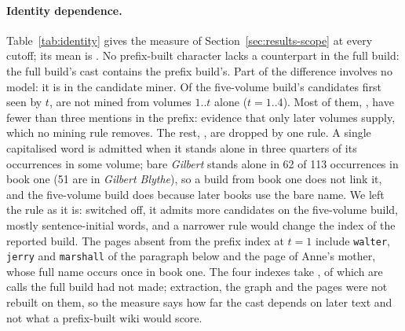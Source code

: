 \paragraph{Identity dependence.}
Table~\ref{tab:identity} gives the measure of Section~\ref{sec:results-scope} at every cutoff;
its mean is . No prefix-built character lacks a counterpart in the full build:
the full build's cast contains the prefix build's. Part of the difference involves no model:
it is in the candidate miner. Of the five-volume build's candidates first seen by $t$,
 are not mined from volumes $1..t$ alone ($t=1..4$). Most of them,
, have fewer than three mentions in the prefix: evidence that only later
volumes supply, which no mining rule removes. The rest, , are dropped by
one rule. A single capitalised word is admitted when it stands alone in
three quarters of its occurrences in some volume; bare \emph{Gilbert} stands alone in 62 of
113 occurrences in book one (51 are in \emph{Gilbert Blythe}), so a build from book one does
not link it, and the five-volume build does because later books use the bare name. We left
the rule as it is: switched off, it admits  more candidates on the
five-volume build, mostly sentence-initial words, and a narrower rule would change the index
of the reported build. The pages
absent from the prefix index at $t=1$ include \texttt{walter}, \texttt{jerry} and
\texttt{marshall} of the paragraph below and the page of Anne's mother, whose full name occurs
once in book one. The four indexes take , of which 
are calls the full build had not made; extraction, the graph and the pages were not rebuilt on them, so the measure
says how far the cast depends on later text and not what a prefix-built wiki would score.

